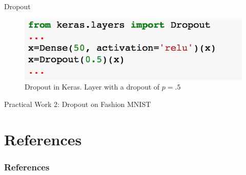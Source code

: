 \documentclass[xcolor=pdftex,dvipsnames,table,mathserif]{beamer}
\begin{document}
\begin{frame}{Dropout}
\begin{figure}
\includegraphics[width=.99 \columnwidth]{../graphics/DropoutKeras}
\caption{Dropout in Keras. Layer with a dropout of $p=.5$}
\end{figure}
Practical Work 2:  Dropout on Fashion MNIST
\end{frame}
	


\section{References}
\begin{frame}[allowframebreaks]
	\frametitle{References}
	
\end{frame}
\end{document}
